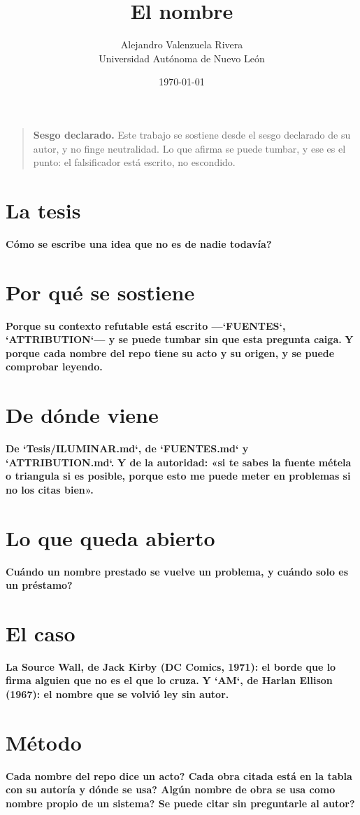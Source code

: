 \documentclass[11pt,a4paper]{article}
\title{El nombre}
\author{Alejandro Valenzuela Rivera\\\small Universidad Autónoma de Nuevo León}
\date{\today}
\begin{document}
\maketitle

\begin{quote}
\textbf{Sesgo declarado.} Este trabajo se sostiene desde el sesgo declarado de su autor, y no finge neutralidad. Lo que afirma se puede tumbar, y ese es el punto: el falsificador está escrito, no escondido.
\end{quote}

\section{La tesis}
\textbf{\textquestiondown{}Cómo se escribe una idea que no es de nadie todavía?}

\section{Por qué se sostiene}
\textbf{Porque su contexto refutable está escrito —`FUENTES`, `ATTRIBUTION`— y se puede tumbar sin que esta pregunta caiga.} \textbf{Y porque cada nombre del repo tiene su acto y su origen, y se puede comprobar leyendo.}

\section{De dónde viene}
\textbf{De `Tesis/ILUMINAR.md`, de `FUENTES.md` y `ATTRIBUTION.md`.} \textbf{Y de la autoridad: «si te sabes la fuente métela o triangula si es posible, porque esto me puede meter en problemas si no los citas bien».}

\section{Lo que queda abierto}
\textbf{\textquestiondown{}Cuándo un nombre prestado se vuelve un problema, y cuándo solo es un préstamo?}

\section{El caso}
\textbf{La Source Wall, de Jack Kirby (DC Comics, 1971): el borde que lo firma alguien que no es el que lo cruza.} \textbf{Y `AM`, de Harlan Ellison (1967): el nombre que se volvió ley sin autor.}

\section{Método}
\textbf{\textquestiondown{}Cada nombre del repo dice un acto? \textquestiondown{}Cada obra citada está en la tabla con su autoría y dónde se usa? \textquestiondown{}Algún nombre de obra se usa como nombre propio de un sistema? \textquestiondown{}Se puede citar sin preguntarle al autor?}
\end{document}

